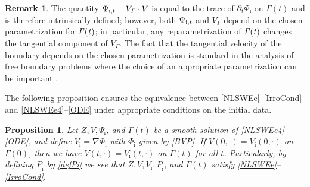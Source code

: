 \documentclass[JEP,XML,SOM,Unicode,NoFloatCountersInSection,published]{cedram}
\newcommand{\dt}{\partial_t}
\newcommand{\ul}[1]{\underline{#1}}
\newcommand{\itGamma}{\mathit{\Gamma}}
\newtheorem{proposition}[theorem]{Proposition}
\theoremstyle{definition}
\newtheorem{remark}[theorem]{Remark}
\begin{document}
\begin{remark}
The quantity $\Psi_{{\rm i},t} - V_\itGamma\cdot V$ is equal to the trace of $\dt\Phi_\mathrm{i}$ on $\itGamma(t)$ and is therefore intrinsically defined;
however, both $\Psi_{{\rm i},t} $ and $V_\itGamma$ depend on the chosen parametrization for $\it\Gamma(t)$;
in particular, any reparametrization of $\it\Gamma(t)$ changes the tangential component of $V_\itGamma$.
The fact that the tangential velocity of the boundary depends on the chosen parametrization is standard in the analysis of free boundary problems
where the choice of an appropriate parametrization can be important \cite{AmbroseMasmoudi,CordobaGancedo}.
\end{remark}

The following proposition ensures the equivalence between \eqref{NLSWEe}--\eqref{IrroCond} and \eqref{NLSWEe4}--\eqref{ODE} under appropriate conditions
on the initial data.

\begin{proposition}\label{prop:equiv}
Let $Z,V,\Psi_\mathrm{i}$, and $\itGamma(t)$ be a smooth solution of \eqref{NLSWEe4}--\eqref{ODE},
and define $V_\mathrm{i}=\nabla\Phi_\mathrm{i}$ with $\Phi_\mathrm{i}$ given by \eqref{BVP}.
If $V(0,\cdot)=V_\mathrm{i}(0,\cdot)$ on $\itGamma(0)$, then we have $V(t,\cdot)=V_\mathrm{i}(t,\cdot)$ on $\itGamma(t)$ for all $t$.
Particularly, by defining $\ul{P}_\mathrm{i}$ by \eqref{defPi} we see that $Z,V,V_\mathrm{i},\ul{P}_\mathrm{i}$, and $\itGamma(t)$ satisfy \eqref{NLSWEe}--\eqref{IrroCond}.
\end{proposition}
\end{document}
